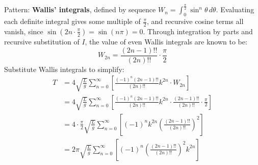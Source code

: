 \documentclass[preview]{standalone}
\begin{document}
\color{white}

Pattern: \textbf{Wallis' integrals}, defined by sequence $W_n =
\int_{0}^{\frac{\pi}{2}} \sin^n \theta \, d\theta$. Evaluating each
definite integral gives some multiple of $\frac{\pi}{2}$, and recursive cosine terms all vanish, since $\sin(2n \cdot \frac{\pi}{2}) = \sin(n\pi) = 0$. Through integration by parts and recursive
substitution of $I$, the value of even Wallis integrals are known to be:
\[
  W_{2n} = \frac{(2n-1)!!}{(2n)!!} \cdot \frac{\pi}{2}
\]
Substitute Wallis integrals to simplify:
\begin{align*}
    T &= 4 \sqrt{\frac{L}{g}} \sum_{n=0}^{\infty} \left[\frac{(-1)^n (2n-1)!!}{(2n)!!} k^{2n} \cdot W_{2n}\right] \\
    &= 4 \sqrt{\frac{L}{g}} \sum_{n=0}^{\infty} \left[\frac{(-1)^n (2n-1)!!}{(2n)!!} k^{2n} \cdot \frac{(2n-1)!!}{(2n)!!} \cdot \frac{\pi}{2}\right] \\
    &= 4 \cdot \frac{\pi}{2} \sqrt{\frac{L}{g}} \sum_{n=0}^{\infty} \left[(-1)^n k^{2n} \left(\frac{(2n-1)!!}{(2n)!!}\right)^2 \right] \\
    &= 2\pi \sqrt{\frac{L}{g}} \sum_{n=0}^{\infty} \left[(-1)^n \left(\frac{(2n-1)!!}{(2n)!!}\right)^2 k^{2n} \right]
\end{align*}
\end{document}
